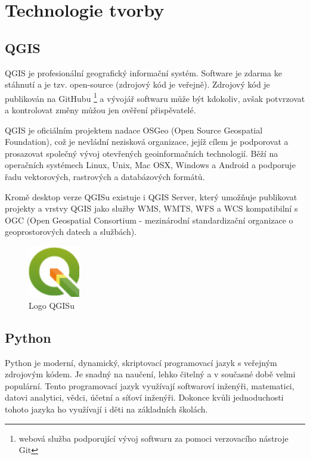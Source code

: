 \chapter{Technologie tvorby}
\label{4-technologie}

\section{QGIS}

QGIS je profesionální geografický informační systém.
Software je zdarma ke stáhnutí a je tzv. open-source (zdrojový kód je veřejně).
Zdrojový kód je publikován na GitHubu \footnote{webová služba podporující vývoj softwaru za pomoci verzovacího nástroje Git}
a vývojář softwaru může být kdokoliv, avšak potvrzovat a kontrolovat změny můžou jen ověření
přispěvatelé.

QGIS je oficiálním projektem nadace OSGeo (Open Source Geospatial Foundation), což je nevládní 
nezisková organizace, jejíž cílem je podporovat a prosazovat společný vývoj otevřených geoinformačních
technologií. Běží na operačních systémech Linux, Unix, Mac OSX, Windows a Android a podporuje
řadu vektorových, rastrových a databázových formátů.

Kromě desktop verze QGISu existuje i QGIS Server, který umožňuje publikovat projekty a vrstvy
QGIS jako služby WMS, WMTS, WFS a WCS kompatibilní s OGC (Open Geospatial Consortium - mezinárodní standardizační organizace
o geoprostorových datech a službách).

\begin{figure}[H] \centering
    \includegraphics[width=64pt]{./pictures/qgis-logo.png}
    \caption[Logo QGISu]{Logo QGISu \cite{qgis}}
	\label{fig:qgis-logo}                                
\end{figure}

\section{Python}
Python je moderní, dynamický, skriptovací programovací jazyk s veřejným zdrojovým kódem. 
Je snadný na naučení, lehko čitelný a v současné době velmi populární. Tento programovací jazyk využívají
softwaroví inženýři, matematici, datovi analytici, vědci, účetní a síťoví inženýři.
Dokonce kvůli jednoduchosti tohoto jazyka ho využívají i děti na základních školách.

